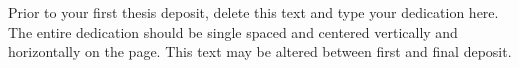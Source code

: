 \vspace*{\fill} 
\noindent
Prior to your first thesis deposit, delete this text and type your dedication here.  The entire dedication should be single spaced and centered vertically and horizontally on the page.  This text may be altered between first and final deposit.
\begin{quote}
\centering
\mylinespacing
\myoptpg
\end{quote}
\vspace*{\fill}